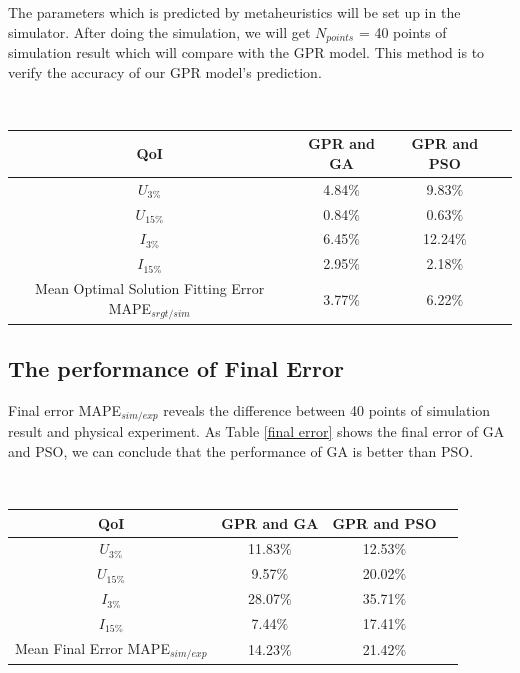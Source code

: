 The parameters which is predicted by metaheuristics will be set up in the simulator. After doing the simulation, we will get $N_{points}$ = 40 points of simulation result which will compare with the GPR model. This method is to verify the accuracy of our GPR model's prediction.

\begin{minipage}{\linewidth}
	\centering
	\renewcommand\arraystretch{0.95}
	~\\
	\label{optimal solution fitting error} 
	\begin{tabular}{cccc}
		\hline
		{QoI } &{GPR and GA} &{GPR and PSO}\\
		\hline
		{$U_{3{\%}}$} & 4.84${\%}$ & 9.83${\%}$  \\
		{$U_{15{\%}}$} &0.84${\%}$ & 0.63${\%}$  \\
		{$I_{3{\%}}$} & 6.45${\%}$ & 12.24${\%}$  \\
		{$I_{15{\%}}$} & 2.95${\%}$ & 2.18${\%}$ \\
		\hline
		{Mean Optimal Solution Fitting Error MAPE$_{srgt/sim}$} & 3.77${\%}$ & 6.22${\%}$\\ 
		\hline
	\end{tabular}
\end{minipage}

\subsection{The performance of Final Error}

Final error MAPE$_{sim/exp}$ reveals the difference between 40 points of simulation result and physical experiment. As Table \ref{final error} shows the final error of GA and PSO, we can conclude that the performance of GA is better than PSO.

\begin{minipage}{\linewidth}
	\centering
	\renewcommand\arraystretch{0.95}
	~\\
	\label{final error} 
	\begin{tabular}{cccc}
		\hline
		{QoI } &{GPR and GA} &{GPR and PSO}\\
		\hline
		{$U_{3{\%}}$} & 11.83${\%}$ & 12.53${\%}$  \\
		{$U_{15{\%}}$} &9.57${\%}$ & 20.02${\%}$  \\
		{$I_{3{\%}}$} & 28.07${\%}$ & 35.71${\%}$  \\
		{$I_{15{\%}}$} & 7.44${\%}$ & 17.41${\%}$ \\
		\hline
		{Mean Final Error MAPE$_{sim/exp}$} & 14.23${\%}$ & 21.42${\%}$\\ 
		\hline
	\end{tabular}
\end{minipage}

